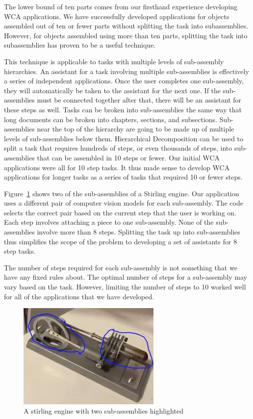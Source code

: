 The lower bound of ten parts comes from our firsthand experience developing WCA
applications.
We have successfully developed applications for objects assembled out of ten or
fewer parts without splitting the task into subassemblies.
However, for objects assembled using more than ten parts, splitting the task
into subassemblies has proven to be a useful technique.

This technique is applicable to tasks
with multiple levels of sub-assembly hierarchies.
An assistant for a task involving multiple sub-assemblies is effectively a
series of independent applications. Once the user completes one sub-assembly,
they will automatically be taken to the assistant for the next one.
If the
sub-assemblies must be connected together after that, there will be an assistant
for these steps as well.
Tasks can be broken into sub-assemblies the same way that long documents can be
broken into chapters, sections, and subsections.
Sub-assemblies near the top of the hierarchy are going to be made up of multiple
levels of sub-assemblies below them.
Hierarchical Decomposition can be used to split a task that requires hundreds of
steps, or even thousands of steps, into sub-assemblies that can be assembled in
10 steps or fewer.
Our initial WCA applications were all for 10 step tasks.
It thus made sense to develop WCA applications for longer tasks as a series of
tasks that required 10 or fewer steps.

Figure~\ref{fig:stirling_full} shows two of the sub-assemblies of a Stirling
engine.
Our application uses a different pair of computer vision models for each
sub-assembly.
The code selects the correct pair based on the current step that the user is
working on.
Each step involves attaching a piece to one sub-assembly.
None of the sub-assemblies involve more than 8 steps.
Splitting the task up into sub-assemblies thus simplifies the scope of the
problem to developing a set of assistants for 8 step tasks.

The number of steps required for each sub-assembly is not something that we have
any fixed rules about.
The optimal number of steps for a sub-assembly may vary based on the task.
However, limiting the number of steps to 10 worked well for all of the
applications that we have developed.

\begin{figure}
  \includegraphics[width=7cm]{figures/stirling/full.png}
  \caption{A stirling engine with two sub-assemblies highlighted
  }\label{fig:stirling_full}
\end{figure}

